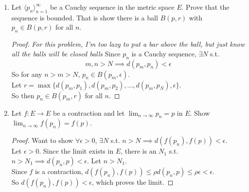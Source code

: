 \documentclass[14pt]{extarticle}
\begin{document}
\begin{enumerate}
\begin{enumerate}
			\item Let $p = (x,y,z)$ and show $\lim_{n\rightarrow\infty} p_n = p$.
			\begin{proof}
				Since the sequences in the part above converge, $\exists N_1>0$, $N_2>0$, and $N_3>0$ s.t.
				\[n>N_1 \implies |x_n-x| < \frac{\epsilon}{\sqrt{3}}\]
				\[n>N_2 \implies |y_n-y| < \frac{\epsilon}{\sqrt{3}}\]
				\[n>N_3 \implies |z_n-z| < \frac{\epsilon}{\sqrt{3}}\]
			Then if $N = \max\{N_1,N_2,N_3\}$ and $p=(x,y,z)$,
			\[n>N \implies ||p_n-p|| = \sqrt{(x_n-x)^2+(y_n-y)^2+(z_n-z)^2}\]
			\[< \sqrt{\left(\frac{\epsilon}{\sqrt{3}}\right)^2 + \left(\frac{\epsilon}{\sqrt{3}}\right)^2 + \left(\frac{\epsilon}{\sqrt{3}}\right)^2} = \epsilon\]
			\end{proof}
			
			\item Conclude that $\R^3$ is a complete metric space.
			\begin{proof}
				The above parts show that an arbitrary Cauchy sequence $\langle p_n \rangle^\infty_{n=1}$ converges, which means that $\R^3$ is complete.
			\end{proof}
		\end{enumerate}
	
		\item Let $\langle p_n \rangle^\infty_{n=1}$ be a Cauchy sequence in the metric space $E$. Prove that the sequence is bounded. That is show there is a ball $B(p,r)$ with $p_n \in B(p,r)$ for all $n$.
		\begin{proof}
			\emph{For this problem, I'm too lazy to put a bar above the ball, but just know all the balls will be closed balls}
			Since $p_n$ is a Cauchy sequence, $\exists N$ s.t.
			\[m,n>N \implies d(p_m,p_n) < \epsilon\]
			So for any $n>m>N$, $p_n \in B(p_m,\epsilon)$.\\
			Let $r = \max\{d(p_m,p_1),d(p_m,p_2),\ldots,d(p_m,p_N),\epsilon\}$.\\
			So then $p_n \in B(p_m,r)$ for all $n$.
		\end{proof}
		
		\item Let $f: E \rightarrow E$ be a contraction and let $\lim_{n\rightarrow\infty} p_n = p$ in $E$. Show $\lim_{n\rightarrow\infty} f(p_n) = f(p)$.
		\begin{proof}
			Want to show $\forall\epsilon>0$, $\exists N$ s.t. $n>N \implies d(f(p_n),f(p))<\epsilon$.\\
			Let $\epsilon > 0$. Since the limit exists in $E$, there is an $N_1$ s.t. $n>N_1 \implies d(p_n,p) < \epsilon$. Let $n>N_1$.\\
			Since $f$ is a contraction, $d(f(p_n),f(p)) \leq \rho d(p_n,p) \leq \rho\epsilon < \epsilon$.\\
			So $d(f(p_n),f(p)) < \epsilon$, which proves the limit.
		\end{proof}
		

\end{enumerate}
\end{document}
